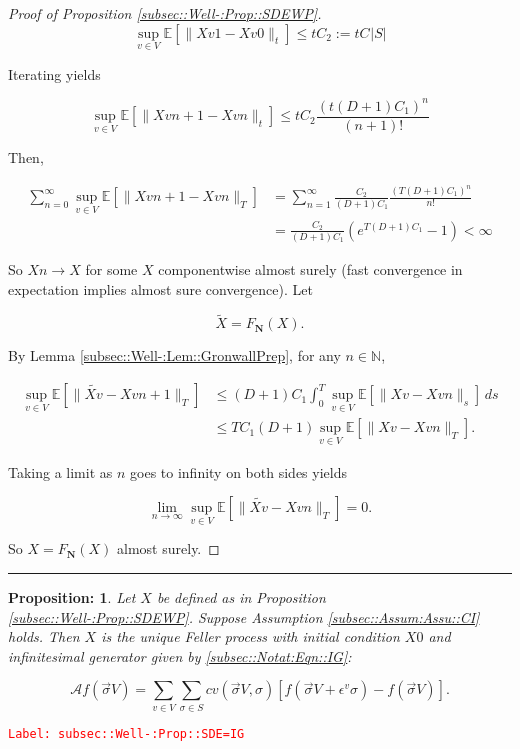 \documentclass[12pt]{article}
\newcommand{\mb}{\mathbb}
\newcommand{\mc}{\mathcal}
\newcommand{\ra}{\rightarrow}
\newcommand{\ep}{\epsilon}
\newcommand{\tr}{\textcolor{red}}
\newcommand{\labe}[1]{\tr{\texttt{Label: #1}}}
\newcommand{\lin}{\rule{\linewidth}{0.4 pt}}
\newcommand{\ex}[1]{\mb{E}\left[#1\right]}			%
\newcommand{\defeq}{:=}								%
\renewcommand{\v}{v}							%
\renewcommand{\S}{S}							%
\newcommand{\s}{\sigma}							%
\newcommand{\sv}{\vec{\s}}						%
\newcommand{\ev}[1]{\ep^{#1}}					%
\newcommand{\T}{T}								%
\renewcommand{\t}{t}							%
\renewcommand{\tt}{s}							%
\newcommand{\X}{X}								%
\newcommand{\IG}{\mc{A}}						%
\newcommand{\IGr}{c}							%
\newcommand{\degr}{D}								%
\newcommand{\poisses}{\mathbf{N}}				%
\newcommand{\numb}{n}								%
\newcommand{\XState}[1]{\S^{#1}}				%
\newcommand{\const}[1]{C_{#1}}						%
\newcommand{\alt}{\widetilde}						%
\newtheorem{prop}[thms]{Proposition: }
\begin{document}
\begin{proof}[Proof of Proposition \ref{subsec::Well-:Prop::SDEWP}]
\[\sup_{\v \in  V}\ex{\|\X{\v}{}{1} - \X{\v}{}{0}\|_\t} \leq \t\const{2} \defeq \t\const{}|\S|\]

Iterating yields

\[\sup_{\v \in  V} \ex{\|\X{\v}{}{\numb+1} - \X{\v}{}{\numb}\|_\t} \leq \t\const{2}\frac{(\t(\degr+1)\const{1})^\numb}{(\numb+1)!}\]

Then,

\begin{align*}
\sum_{\numb=0}^\infty \sup_{\v \in  V} \ex{\|\X{\v}{}{\numb+1} - \X{\v}{}{\numb}\|_\T} &= \sum_{\numb=1}^\infty \frac{\const{2}}{(\degr+1)\const{1}}\frac{(\T(\degr+1)\const{1})^{\numb}}{\numb !}\\
& = \frac{\const{2}}{(\degr+1)\const{1}}(e^{\T(\degr+1)\const{1}} - 1) < \infty
\end{align*}


So \(\X{}{}{\numb} \ra \X{}{}\) for some \(\X{}{}\) componentwise almost surely (fast convergence in expectation implies almost sure convergence). Let 

\[\alt{\X{}{}} = F_\poisses(\X{}{}).\]

By Lemma \ref{subsec::Well-:Lem::GronwallPrep}, for any \(\numb\in\mb{N}\),

\begin{align*}
\sup_{\v \in  V} \ex{\|\alt{\X{\v}{}} - \X{\v}{}{\numb+1}\|_\T} &\leq (\degr+1)\const{1}\int_0^\T \sup_{\v \in  V}\ex{\|\X{\v}{} - \X{\v}{}{\numb}\|_\tt}\,d\tt \\
&\leq \T\const{1}(\degr+1)\sup_{\v\in  V} \ex{\|\X{\v}{} - \X{\v}{}{\numb}\|_\T}.
\end{align*}

Taking a limit as \(\numb\) goes to infinity on both sides yields

\[\lim_{\numb\ra\infty} \sup_{\v \in  V} \ex{\|\alt{\X{\v}{}} - \X{\v}{}{\numb}\|_\T} = 0.\]

So \(\X{}{}= F_\poisses(\X{}{})\) almost surely.
\end{proof}

\lin

\begin{prop}
Let \(\X{}{}\) be defined as in Proposition \ref{subsec::Well-:Prop::SDEWP}. Suppose Assumption \ref{subsec::Assum:Assu::CI} holds. Then \(\X{}{}\) is the unique Feller process with initial condition \(\X{}{0}\) and infinitesimal generator given by \eqref{subsec::Notat:Eqn::IG}:

\[\IG f(\sv{}{ V}) = \sum_{\v\in  V}\sum_{\s \in \S} \IGr{\v}(\sv{}{ V},\s)[f(\sv{}{ V} + \ev{\v}\s) - f(\sv{}{ V})].\]
\label{subsec::Well-:Prop::SDE=IG}
\end{prop}
\labe{subsec::Well-:Prop::SDE=IG}
\end{document}
